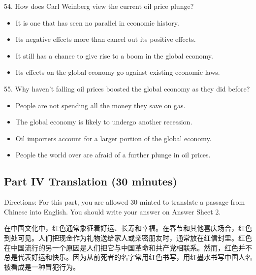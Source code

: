 \documentclass[UTF8,11pt]{ctexart}
\begin{document}
54. How does Carl Weinberg view the current oil price plunge?


\begin{itemize}[leftmargin=2em,itemsep=.2em,topsep=.4em]\item[A.] It is one that has seen no parallel in economic history.
\item[B.] Its negative effects more than cancel out its positive effects.
\item[C.] It still has a chance to give rise to a boom in the global economy.
\item[D.] Its effects on the global economy go against existing economic laws.
\end{itemize}

55. Why haven't falling oil prices boosted the global economy as they did before?


\begin{itemize}[leftmargin=2em,itemsep=.2em,topsep=.4em]\item[A.] People are not spending all the money they save on gas.
\item[B.] The global economy is likely to undergo another recession.
\item[C.] Oil importers account for a larger portion of the global economy.
\item[D.] People the world over are afraid of a further plunge in oil prices.
\end{itemize}

\subsection*{\textbf{Part IV Translation (30 minutes)}}


Directions: For this part, you are allowed 30 minted to translate a passage from Chinese into English. You should write your answer on Answer Sheet 2.


在中国文化中，红色通常象征着好运、长寿和幸福。在春节和其他喜庆场合，红色到处可见。人们把现金作为礼物送给家人或亲密朋友时，通常放在红信封里。红色在中国流行的另一个原因是人们把它与中国革命和共产党相联系。然而，红色并不总是代表好运和快乐。因为从前死者的名字常用红色书写，用红墨水书写中国人名被看成是一种冒犯行为。
\end{document}
